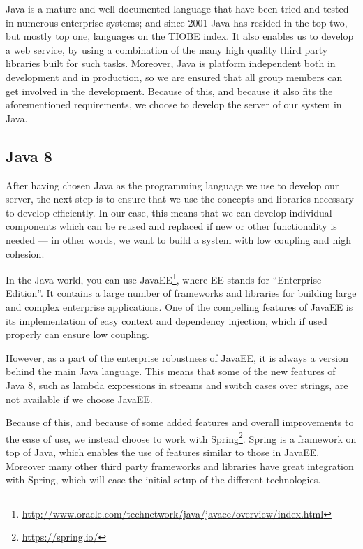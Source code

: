 Java is a mature and well documented language that have been tried and tested in numerous enterprise systems; and since 2001 Java has resided in the top two, but mostly top one, languages on the TIOBE index\cite{TiobeIndex}.
It also enables us to develop a web service, by using a combination of the many high quality third party libraries built for such tasks.
Moreover, Java is platform independent both in development and in production, so we are ensured that all group members can get involved in the development.
Because of this, and because it also fits the aforementioned requirements, we choose to develop the server of our system in Java.

\subsection{Java 8}\label{java8}
After having chosen Java as the programming language we use to develop our server, the next step is to ensure that we use the concepts and libraries necessary to develop efficiently.
In our case, this means that we can develop individual components which can be reused and replaced if new or other functionality is needed --- in other words, we want to build a system with low coupling and high cohesion.

In the Java world, you can use JavaEE\footnote{\url{http://www.oracle.com/technetwork/java/javaee/overview/index.html}}, where EE stands for ``Enterprise Edition''.
It contains a large number of frameworks and libraries for building large and complex enterprise applications.
One of the compelling features of JavaEE is its implementation of easy context and dependency injection, which if used properly can ensure low coupling.

However, as a part of the enterprise robustness of JavaEE, it is always a version behind the main Java language.
This means that some of the new features of Java 8, such as lambda expressions in streams and switch cases over strings, are not available if we choose JavaEE.

Because of this, and because of some added features and overall improvements to the ease of use, we instead choose to work with Spring\footnote{\url{https://spring.io/}}.
Spring is a framework on top of Java, which enables the use of features similar to those in JavaEE.
Moreover many other third party frameworks and libraries have great integration with Spring, which will ease the initial setup of the different technologies.

